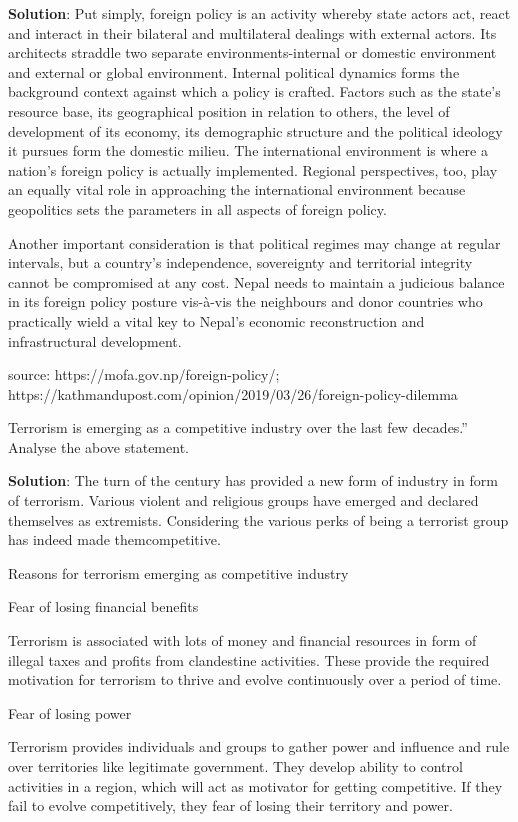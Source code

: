 \documentclass[
]{book}
\newcommand{\question}{\item}
\newenvironment{solution}{ {\bfseries Solution}:}{}
\begin{document}
\begin{questions}
\begin{solution}
Put simply, foreign policy is an activity whereby state actors act, react and interact in their bilateral and multilateral dealings with external actors. Its architects straddle two separate environments-internal or domestic environment and external or global environment. Internal political dynamics forms the background context against which a policy is crafted. Factors such as the state's resource base, its geographical position in relation to others, the level of development of its economy, its demographic structure and the political ideology it pursues form the domestic milieu. The international environment is where a nation's foreign policy is actually implemented. Regional perspectives, too, play an equally vital role in approaching the international environment because geopolitics sets the parameters in all aspects of foreign policy. 

Another important consideration is that political regimes may change at regular intervals, but a country’s independence, sovereignty and territorial integrity cannot be compromised at any cost. Nepal needs to maintain a judicious balance in its foreign policy posture vis-à-vis the neighbours and donor countries who practically wield a vital key to Nepal’s economic reconstruction and infrastructural development.

source: https://mofa.gov.np/foreign-policy/; https://kathmandupost.com/opinion/2019/03/26/foreign-policy-dilemma
\end{solution}

\question Terrorism is emerging as a competitive industry over the last few decades.”  Analyse the above statement.

\begin{solution}
The turn of the century has provided a new form of industry in form of terrorism. Various violent and religious groups have emerged and declared themselves as extremists. Considering the various perks of being a terrorist group has indeed made themcompetitive.

Reasons for terrorism emerging as competitive industry

Fear of losing financial benefits

Terrorism is associated with lots of money and financial resources in form of illegal taxes and profits from clandestine activities. These provide the required motivation for terrorism to thrive and evolve continuously over a period of time.

Fear of losing power

Terrorism provides individuals and groups to gather power and influence and rule over territories like legitimate government. They develop ability to control activities in a region, which will act as motivator for getting competitive. If they fail to evolve competitively, they fear of losing their territory and power.


\end{solution}
\end{questions}
\end{document}
